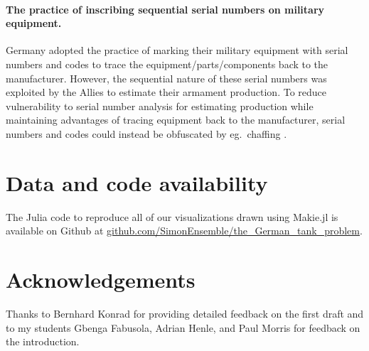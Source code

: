 \documentclass[11pt, oneside]{article}
\begin{document}
\paragraph{The practice of inscribing sequential serial numbers on military equipment.}
Germany adopted the practice of marking their military equipment with serial numbers and codes to trace the equipment/parts/components back to the manufacturer. However, the sequential nature of these serial numbers was exploited by the Allies to estimate their armament production. 
To reduce vulnerability to serial number analysis for estimating production while maintaining advantages of tracing equipment back to the manufacturer, serial numbers and codes could instead be obfuscated by eg.\ chaffing \cite{rivest1998chaffing}. 

\section*{Data and code availability} The Julia \cite{bezanson2012julia} code to reproduce all of our visualizations drawn using Makie.jl \cite{DanischKrumbiegel2021} is available on Github at \url{github.com/SimonEnsemble/the_German_tank_problem}.

\section*{Acknowledgements}
Thanks to Bernhard Konrad for providing detailed feedback on the first draft and to my students Gbenga Fabusola, Adrian Henle, and Paul Morris for feedback on the introduction. 



\end{document}
